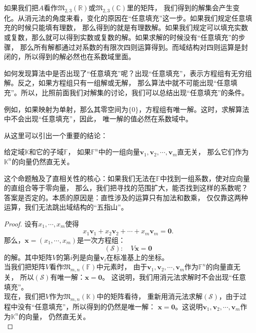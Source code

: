 \documentclass[12pt,UTF8]{ctexbook}
\begin{document}
如果我们把$A$看作$\mathfrak{M}_{2,3}(\mathbb{R})$或$\mathfrak{M}_{2,3}(\mathbb{C})$里的矩阵，
我们得到的解集会产生变化。从消元法的角度来看，变化的原因在“任意填充”这一步。如果我们规定任意填充的时候只能填有理数，
那么得到的就是有理数解。如果我们规定可以填充实数或复数，那么就可以得到实数或复数的解。如果求解的时候没有“任意填充”的步骤，
那么所有解都通过对系数的有限次四则运算得到。而域结构对四则运算是封闭的，所以得到的解必然也在系数域里面。

如何发现算法中是否出现了“任意填充”呢？出现“任意填充”，表示方程组有无穷组解。反之，如果方程组只有一组解或无解，
那么算法中就不可能出现“任意填充”。所以，比照前面我们对解集的讨论，我们可以总结出现“任意填充”的条件。

例如，如果映射为单射，那么其零空间为$\{0\}$，方程组有唯一解。这时，求解算法中不会出现“任意填充”，因此，
唯一解的值必然在系数域中。

从这里可以引出一个重要的结论：
\begin{pp}\label{pp:5_0}
    给定域$\mathbb{K}$和它的子域$\mathbb{F}$，
    如果$\mathbb{F}^n$中的一组向量$\mathbf{v}_1, \mathbf{v}_2, \cdots , \mathbf{v}_m$直无关，
    那么它们作为$\mathbb{K}^n$的向量仍然直无关。
\end{pp}
这个命题触及了直相关性的核心：如果我们无法在$\mathbb{F}$中找到一组系数，使对应向量的直组合等于零向量，
那么，我们把寻找的范围扩大，能否找到这样的系数呢？答案是否定的。本质的原因是：直性涉及的运算只有加法和数乘，
仅仅靠这两种运算，我们无法跳出域结构的“五指山”。

\begin{proof} %
设有$x_1, \cdots, x_m$使得
$$ x_1\mathbf{v}_1 + x_2 \mathbf{v}_2 + \cdots + x_m \mathbf{v}_m = \mathbf{0}. $$
那么，$\mathbf{x} = (x_1, \cdots, x_m)$是一次方程组：
$$ (\mathcal{S}): \quad V\mathbf{x} = \mathbf{0} $$
的解。其中矩阵$V$的第$i$列是向量$\mathbf{v}_i$在标准基上的坐标。\\
当我们把矩阵$V$看作$\mathfrak{M}_{m,n}(\mathbb{F})$中元素时，
由于$\mathbf{v}_1, \mathbf{v}_2, \cdots , \mathbf{v}_m$作为$\mathbb{F}^n$的向量直无关，
所以$(\mathcal{S})$有唯一解：$\mathbf{x} = \mathbf{0}$。
这说明，我们用消元法求解时不会出现“任意填充”。\\
现在，我们把$V$作为$\mathfrak{M}_{m,n}(\mathbb{K})$中的矩阵看待，
重新用消元法求解$(\mathcal{S})$，由于过程中没有“任意填充”，所以得到的仍然是唯一解：
$\mathbf{x} = \mathbf{0}$。这说明$\mathbf{v}_1, \mathbf{v}_2, \cdots , \mathbf{v}_m$作为$\mathbb{K}^n$的向量，
仍然直无关。\\
\end{proof}
\end{document}
